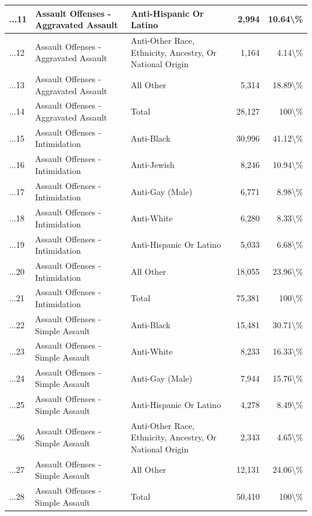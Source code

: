\documentclass[
]{krantz}
\begin{document}
\begin{longtable}[t]{l|l|l|r|r}
\hline
...11 & Assault Offenses - Aggravated Assault & Anti-Hispanic Or Latino & 2,994 & 10.64\textbackslash{}\%\\
\hline
...12 & Assault Offenses - Aggravated Assault & Anti-Other Race, Ethnicity, Ancestry, Or National Origin & 1,164 & 4.14\textbackslash{}\%\\
\hline
...13 & Assault Offenses - Aggravated Assault & All Other & 5,314 & 18.89\textbackslash{}\%\\
\hline
...14 & Assault Offenses - Aggravated Assault & Total & 28,127 & 100\textbackslash{}\%\\
\hline
...15 & Assault Offenses - Intimidation & Anti-Black & 30,996 & 41.12\textbackslash{}\%\\
\hline
...16 & Assault Offenses - Intimidation & Anti-Jewish & 8,246 & 10.94\textbackslash{}\%\\
\hline
...17 & Assault Offenses - Intimidation & Anti-Gay (Male) & 6,771 & 8.98\textbackslash{}\%\\
\hline
...18 & Assault Offenses - Intimidation & Anti-White & 6,280 & 8.33\textbackslash{}\%\\
\hline
...19 & Assault Offenses - Intimidation & Anti-Hispanic Or Latino & 5,033 & 6.68\textbackslash{}\%\\
\hline
...20 & Assault Offenses - Intimidation & All Other & 18,055 & 23.96\textbackslash{}\%\\
\hline
...21 & Assault Offenses - Intimidation & Total & 75,381 & 100\textbackslash{}\%\\
\hline
...22 & Assault Offenses - Simple Assault & Anti-Black & 15,481 & 30.71\textbackslash{}\%\\
\hline
...23 & Assault Offenses - Simple Assault & Anti-White & 8,233 & 16.33\textbackslash{}\%\\
\hline
...24 & Assault Offenses - Simple Assault & Anti-Gay (Male) & 7,944 & 15.76\textbackslash{}\%\\
\hline
...25 & Assault Offenses - Simple Assault & Anti-Hispanic Or Latino & 4,278 & 8.49\textbackslash{}\%\\
\hline
...26 & Assault Offenses - Simple Assault & Anti-Other Race, Ethnicity, Ancestry, Or National Origin & 2,343 & 4.65\textbackslash{}\%\\
\hline
...27 & Assault Offenses - Simple Assault & All Other & 12,131 & 24.06\textbackslash{}\%\\
\hline
...28 & Assault Offenses - Simple Assault & Total & 50,410 & 100\textbackslash{}\%\\

\end{longtable}
\end{document}
